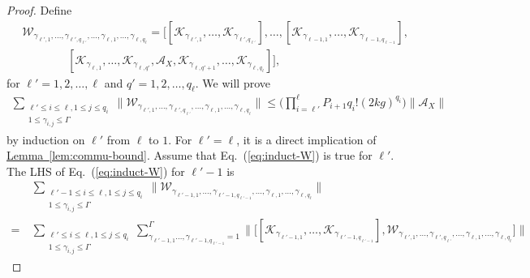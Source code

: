 \documentclass[11pt]{article}
\newcommand{\eq}[1]{(\ref{eq:#1})}
\newcommand{\lem}[1]{\hyperref[lem:#1]{Lemma~\ref*{lem:#1}}}
\newcommand{\mc}{\mathcal}
\begin{document}
\begin{proof}
    Define \begin{align*}
        &\mc W_{\gamma_{\ell',1}, \ldots, \gamma_{\ell', q_{\ell'}}, \ldots, \gamma_{\ell, 1}, \ldots, \gamma_{\ell,q_\ell}} =  \Big[ [\mathcal{K}_{\gamma_{\ell',1}}, \ldots, \mathcal{K}_{\gamma_{\ell', q_{\ell'}}}], \ldots, [\mathcal{K}_{\gamma_{\ell-1,1}}, \ldots, \mathcal{K}_{\gamma_{\ell-1, q_{\ell-1}}}], \\
        &\qquad\qquad [\mathcal{K}_{\gamma_{\ell,1}}, \ldots, \mathcal{K}_{\gamma_{\ell, q'}}, \mathcal{A}_X, \mathcal{K}_{\gamma_{\ell, q'+1}}, \ldots, \mathcal{K}_{\gamma_{\ell, q_\ell}}] \Big],
    \end{align*} 
    for $\ell' = 1, 2, \ldots, \ell$ and $q' = 1, 2, \ldots, q_\ell$. We will prove \begin{align} \label{eq:induct-W}
        \sum_{\substack{\ell'\le i\le \ell, 1\le j\le q_i\\ 1\le \gamma_{i,j}\le \Gamma}} \Big\|\mc W_{\gamma_{\ell',1}, \ldots, \gamma_{\ell', q_{\ell'}}, \ldots, \gamma_{\ell, 1}, \ldots, \gamma_{\ell,q_\ell}}\Big\|\le \bigg(\prod_{i=\ell'}^{\ell}P_{i+1} q_i!(2kg)^{q_i}\bigg)\|\mc A_X\|
    \end{align}
    by induction on $\ell'$ from $\ell$ to $1$. For $\ell'=\ell$, it is a direct implication of \lem{commu-bound}. Assume that Eq.~\eq{induct-W} is true for $\ell'$. The LHS of Eq.~\eq{induct-W} for $\ell'-1$ is \begin{align*}
        &\sum_{\substack{\ell'-1\le i\le \ell, 1\le j\le q_i\\ 1\le \gamma_{i,j}\le \Gamma}} \Big\|\mc W_{\gamma_{\ell'-1,1}, \ldots, \gamma_{\ell'-1, q_{\ell'-1}}, \ldots, \gamma_{\ell, 1}, \ldots, \gamma_{\ell,q_\ell}}\Big\|  \\
        =~& \sum_{\substack{\ell'\le i\le \ell, 1\le j\le q_i\\ 1\le \gamma_{i,j}\le \Gamma}} \sum_{\gamma_{\ell'-1,1}\ldots, \gamma_{\ell'-1,q_{\ell'-1}}=1}^{\Gamma}\bigg\|\Big[[\mathcal{K}_{\gamma_{\ell'-1,1}}, \ldots, \mathcal{K}_{\gamma_{\ell'-1, q_{\ell'-1}}}], \mc W_{\gamma_{\ell',1}, \ldots, \gamma_{\ell', q_{\ell'}}, \ldots, \gamma_{\ell, 1}, \ldots, \gamma_{\ell,q_\ell}}\Big]\bigg\|

\end{align*}
\end{proof}
\end{document}
